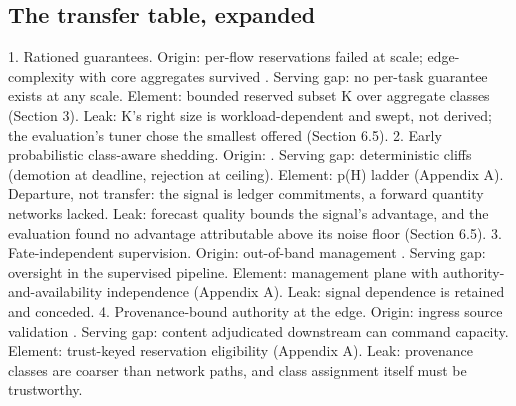 \subsection{The transfer table, expanded}

1. Rationed guarantees. Origin: per-flow reservations failed at scale;
edge-complexity with core aggregates survived \citep{rfc2205,rfc2475}.
Serving gap: no per-task guarantee exists at any scale. Element: bounded
reserved subset K over aggregate classes (Section 3). Leak: K's right
size is workload-dependent and swept, not derived; the evaluation's
tuner chose the smallest offered (Section 6.5). 2. Early probabilistic
class-aware shedding. Origin: \citep{floyd1993red,rfc2597}. Serving gap:
deterministic cliffs (demotion at deadline, rejection at ceiling).
Element: p(H) ladder (Appendix A). Departure, not transfer: the signal
is ledger commitments, a forward quantity networks lacked. Leak:
forecast quality bounds the signal's advantage, and the evaluation found
no advantage attributable above its noise floor (Section 6.5). 3.
Fate-independent supervision. Origin: out-of-band management
\citep{ipmi_spec}. Serving gap: oversight in the supervised pipeline. Element:
management plane with authority-and-availability independence (Appendix
A). Leak: signal dependence is retained and conceded. 4.
Provenance-bound authority at the edge. Origin: ingress source
validation \citep{rfc2827,rfc3704}. Serving gap: content adjudicated
downstream can command capacity. Element: trust-keyed reservation
eligibility (Appendix A). Leak: provenance classes are coarser than
network paths, and class assignment itself must be trustworthy.
